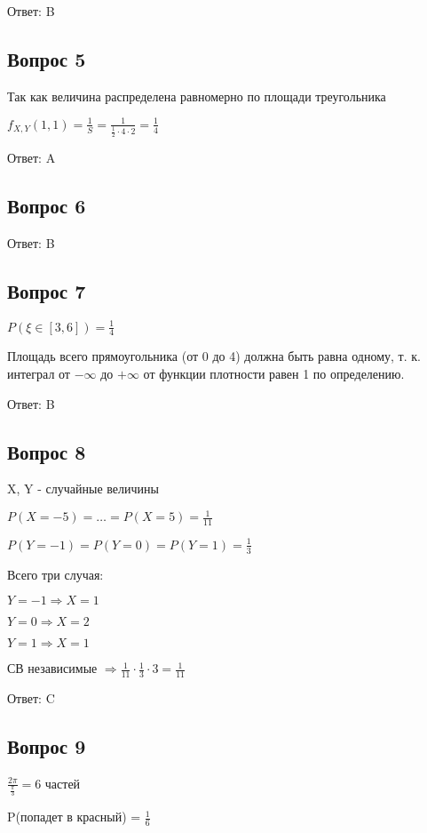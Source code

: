 \documentclass{article}
\begin{document}
\begin{flushleft}
Ответ: B

\subsection{Вопрос 5}

Так как величина распределена равномерно по площади треугольника

$f_{X,Y}(1,1) = \frac{1}{S} = \frac{1}{\frac{1}{2}\cdot 4\cdot 2} = \frac{1}{4}$

Ответ: A

\subsection{Вопрос 6}

Ответ: B

\subsection{Вопрос 7}

$P({\xi\in[3,6]}) = \frac{1}{4}$

Площадь всего прямоугольника (от 0 до 4) должна быть равна одному, т. к. интеграл от $-\infty$ до $+\infty$ от функции плотности равен 1 по определению.

Ответ: B

\subsection{Вопрос 8}

X, Y - случайные величины

$P(X=-5) = \dots = P(X=5) = \frac{1}{11}$

$P(Y=-1) = P(Y=0) = P(Y=1) = \frac{1}{3}$

Всего три случая:

$Y = -1 \Rightarrow X = 1$

$Y = 0 \Rightarrow X = 2$

$Y = 1 \Rightarrow X = 1$

СВ независимые $\Rightarrow \frac{1}{11} \cdot\frac{1}{3} \cdot 3 = \frac{1}{11}$

Ответ: C

\subsection{Вопрос 9}

$\frac{2\pi}{\frac{\pi}{3}} = 6$ частей

P(попадет в красный) = $\frac{1}{6}$


\end{flushleft}
\end{document}
